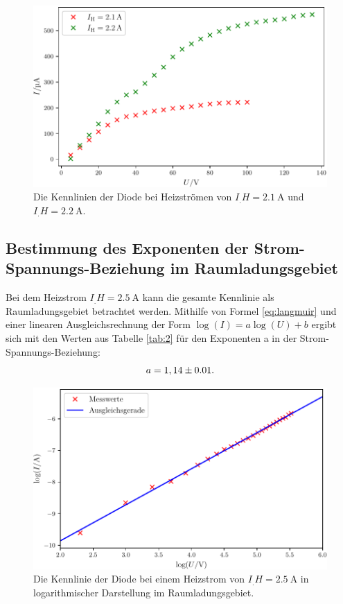 \begin{figure}
\centering
\includegraphics[width=\linewidth-70pt,height=\textheight-70pt,keepaspectratio]{content/images/IH_21-2.pdf}
\caption{Die Kennlinien der Diode bei Heizströmen von $I_.H=\SI{2,1}{\ampere}$ und $I_.H=\SI{2,2}{\ampere}$.}
\label{fig:Kennlinien2}
\end{figure}

\subsection{Bestimmung des Exponenten der Strom-Spannungs-Beziehung im Raumladungsgebiet}

Bei dem Heizstrom $I_.H=\SI{2,5}{\ampere}$ kann die gesamte Kennlinie als Raumladungsgebiet betrachtet werden.
Mithilfe von Formel \eqref{eq:langmuir} und einer linearen Ausgleichsrechnung der Form $\log(I)=a\log(U)+b$ ergibt sich mit den Werten aus Tabelle \ref{tab:2} für den Exponenten a in der Strom-Spannungs-Beziehung:
\[
a = 1,14\pm0.01\text{.}\\
\]

\begin{figure}
\centering
\includegraphics[width=\linewidth-70pt,height=\textheight-70pt,keepaspectratio]{content/images/IH_25_log.pdf}
\caption{Die Kennlinie der Diode bei einem Heizstrom von $I_.H=\SI{2,5}{\ampere}$ in logarithmischer Darstellung im Raumladungsgebiet.}
\label{fig:Kennlinie25_log}
\end{figure}


